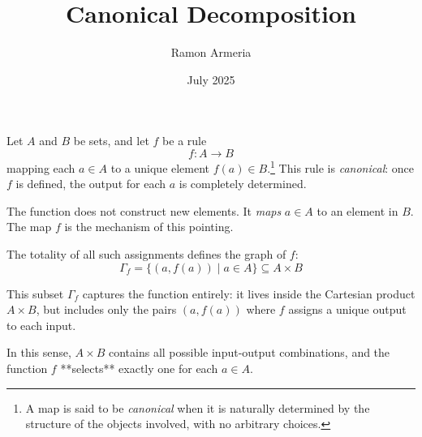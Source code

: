 \documentclass[12pt]{article}
\title{Canonical Decomposition}
\author{Ramon Armeria}
\date{July 2025}
\newcommand{\canonicalnote}{\footnote{A map is said to be \emph{canonical} when it is naturally determined by the structure of the objects involved, with no arbitrary choices.}}
\begin{document}
	
	\maketitle
Let \( A \) and \( B \) be sets, and let \( f \) be a rule
\[
f: A \to B
\]
mapping each \( a \in A \) to a unique element \( f(a) \in B \).\canonicalnote{}  
This rule is \textit{canonical}: once \( f \) is defined, the output for each \( a \) is completely determined.

\medskip

The function does not construct new elements. It \textit{maps} \( a \in A \) to an element in \( B \). The map \( f \) is the mechanism of this pointing.

\medskip

The totality of all such assignments defines the graph of \( f \):
\[
\Gamma_f = \{ (a, f(a)) \mid a \in A \} \subseteq A \times B
\]

This subset \( \Gamma_f \) captures the function entirely:  
it lives inside the Cartesian product \( A \times B \),  
but includes only the pairs \( (a, f(a)) \) where \( f \) assigns a unique output to each input.

In this sense, \( A \times B \) contains all possible input-output combinations,  
and the function \( f \) **selects** exactly one for each \( a \in A \).
\end{document}
